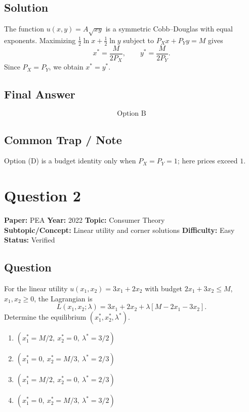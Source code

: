 \documentclass[11pt]{article}
\begin{document}
\subsection*{Solution}
The function $u(x,y) = A\sqrt{xy}$ is a symmetric Cobb--Douglas with equal exponents.
Maximizing $\tfrac{1}{2}\ln x + \tfrac{1}{2}\ln y$ subject to $P_X x + P_Y y = M$ gives
\[
x^* = \frac{M}{2P_X}, \qquad y^* = \frac{M}{2P_Y}.
\]
Since $P_X = P_Y$, we obtain $x^* = y^*$.

\subsection*{Final Answer}
\[
\boxed{\text{Option B}}
\]

\subsection*{Common Trap / Note}
Option (D) is a budget identity only when $P_X = P_Y = 1$; here prices exceed $1$.

\section*{Question 2}
\textbf{Paper:} PEA \quad \textbf{Year:} 2022 \quad \textbf{Topic:} Consumer Theory \\
\textbf{Subtopic/Concept:} Linear utility and corner solutions \quad \textbf{Difficulty:} Easy \\
\textbf{Status:} Verified

\subsection*{Question}
For the linear utility $u(x_1,x_2) = 3x_1 + 2x_2$ with budget $2x_1 + 3x_2 \leq M$,
$x_1, x_2 \geq 0$, the Lagrangian is
\[
L(x_1,x_2;\lambda) = 3x_1 + 2x_2 + \lambda[M - 2x_1 - 3x_2].
\]
Determine the equilibrium $(x_1^*, x_2^*, \lambda^*)$.
\begin{enumerate}[label=(\Alph*)]
\item $(x_1^* = M/2,\ x_2^* = 0,\ \lambda^* = 3/2)$
\item $(x_1^* = 0,\ x_2^* = M/3,\ \lambda^* = 2/3)$
\item $(x_1^* = M/2,\ x_2^* = 0,\ \lambda^* = 2/3)$
\item $(x_1^* = 0,\ x_2^* = M/3,\ \lambda^* = 3/2)$
\end{enumerate}
\end{document}
